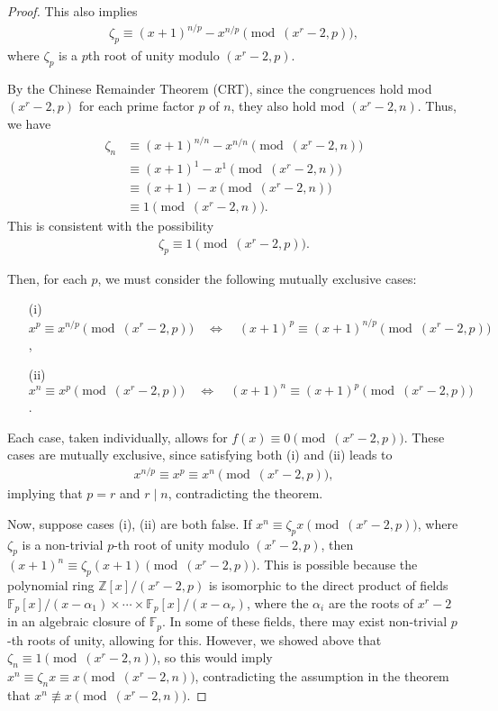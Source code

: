 \documentclass{article}
\theoremstyle{plain}
\theoremstyle{definition}
\begin{document}
\begin{proof}
This also implies
\begin{align*}
    \zeta_p \equiv (x+1)^{n/p} - x^{n/p} \pmod{(x^r-2, p)} ,
\end{align*}
where $\zeta_p$ is a $p$th root of unity modulo $(x^r-2, p)$.

By the Chinese Remainder Theorem (CRT), since the congruences hold mod $(x^r-2, p)$ for each prime factor $p$ of $n$, they also hold mod $(x^r-2, n)$. Thus, we have
\begin{align*}
\zeta_n &\equiv (x+1)^{n/n} - x^{n/n} \pmod{(x^r-2, n)} \\
&\equiv (x+1)^1 - x^1 \pmod{(x^r-2, n)} \\
&\equiv (x+1) - x \pmod{(x^r-2, n)} \\
&\equiv 1 \pmod{(x^r-2, n)} .
\end{align*}
This is consistent with the possibility
\begin{align*}
\zeta_p \equiv 1 \pmod{(x^r-2, p)} .
\end{align*}

Then, for each $p$, we must consider the following mutually exclusive cases:
\begin{enumerate}
\item[(i)] $x^p \equiv x^{n/p} \pmod{(x^r-2, p)} \quad\Longleftrightarrow\quad (x+1)^p \equiv (x+1)^{n/p} \pmod{(x^r-2, p)}$,
\item[(ii)] $x^n \equiv x^p \pmod{(x^r-2, p)} \quad\Longleftrightarrow\quad (x+1)^n \equiv (x+1)^p \pmod{(x^r-2, p)}$.
\end{enumerate}
Each case, taken individually, allows for $f(x) \equiv 0 \pmod{(x^r-2,p)}$. These cases are mutually exclusive, since satisfying both (i) and (ii) leads to
\begin{align*}
    x^{n/p} \equiv x^p \equiv x^n \pmod{(x^r-2, p)} ,
\end{align*}
implying that $p=r$ and $r \mid n$, contradicting the theorem.

Now, suppose cases (i), (ii) are both false. If $x^n \equiv \zeta_p x \pmod{(x^r-2, p)}$, where $\zeta_p$ is a non-trivial $p$-th root of unity modulo $(x^r-2, p)$, then $(x+1)^n \equiv \zeta_p (x+1) \pmod{(x^r-2, p)}$. This is possible because the polynomial ring $\mathbb{Z}[x]/(x^r-2, p)$ is isomorphic to the direct product of fields $\mathbb{F}_p[x]/(x-\alpha_1) \times \cdots \times \mathbb{F}_p[x]/(x-\alpha_r)$, where the $\alpha_i$ are the roots of $x^r-2$ in an algebraic closure of $\mathbb{F}_p$. In some of these fields, there may exist non-trivial $p$-th roots of unity, allowing for this. However, we showed above that $\zeta_n \equiv 1 \pmod{(x^r-2, n)}$, so this would imply $x^n \equiv \zeta_n x \equiv x \pmod{(x^r-2, n)}$, contradicting the assumption in the theorem that $x^n \not\equiv x \pmod{(x^r-2, n)}$.


\end{proof}
\end{document}
